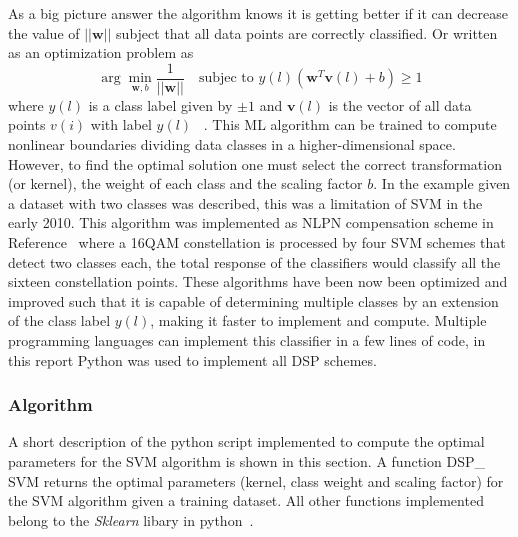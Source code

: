 As a big picture answer the algorithm knows it is getting better if it can decrease the value of $||\textbf{w}||$ subject that all data points are correctly classified. Or written as an optimization problem as
\begin{equation}
\arg\min_{\textbf{w},b}\frac{1}{||\textbf{w}||} \ \ \  \text{   subjec to } y(l)(\textbf{w}^{T}\textbf{v}(l)+b)\geq1 
\end{equation}
where $y(l)$ is a class label given by $\pm 1$ and $\textbf{v}(l)$ is the vector of all data points $v(i)$ with label $y(l)$  ~\cite{boser1992training}. This ML algorithm can be trained to compute nonlinear boundaries dividing data classes in a higher-dimensional space. However, to find the optimal solution one must select the correct transformation (or kernel), the weight of each class and the scaling factor $b$. In the example given a dataset with two classes was described, this was a limitation of SVM in the early 2010. This algorithm  was implemented as NLPN compensation scheme in Reference~\cite{Nonparameter} where a 16QAM constellation is processed by four SVM schemes that detect two classes each, the total response of the classifiers would classify all the sixteen constellation points. These algorithms have been now been optimized and improved such that it is capable of determining multiple classes by an extension of the class label $y(l)$, making it faster to implement and compute. Multiple programming languages can implement this classifier in a few lines of code, in this report Python was used to implement all DSP schemes.
\subsubsection{Algorithm}

A short description of the python script implemented to compute the optimal parameters for the SVM algorithm is shown in this section. A function DSP\_ SVM returns the optimal parameters (kernel, class weight and scaling factor) for the SVM algorithm given a training dataset. All other functions implemented belong to the \textit{Sklearn} libary in python~\cite{scikit-learn}.

